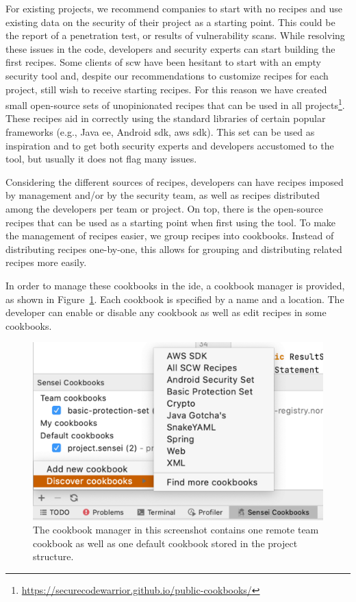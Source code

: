 For existing projects, we recommend companies to start with no recipes and use existing data on the security of their project as a starting point.
This could be the report of a penetration test, or results of vulnerability scans.
While resolving these issues in the code, developers and security experts can start building the first recipes.
Some clients of \gls{scw} have been hesitant to start with an empty security tool and, despite our recommendations to customize recipes for each project, still wish to receive starting recipes.
For this reason we have created small open-source sets of unopinionated recipes that can be used in all projects\footnote{\url{https://securecodewarrior.github.io/public-cookbooks/}}.
These recipes aid in correctly using the standard libraries of certain popular frameworks (e.g., Java 
\gls{ee}, Android \gls{sdk}, \gls{aws} \gls{sdk}).
This set can be used as inspiration and to get both security experts and developers accustomed to the tool, but usually it does not flag many issues.

Considering the different sources of recipes, developers can have recipes imposed by management and/or by the security team, as well as recipes distributed among the developers per team or project.
On top, there is the open-source recipes that can be used as a starting point when first using the tool.
To make the management of recipes easier, we group recipes into cookbooks.
Instead of distributing recipes one-by-one, this allows for grouping and distributing related recipes more easily. 

In order to manage these cookbooks in the \gls{ide}, a cookbook manager is provided, as shown in Figure~\ref{fig:cookbookmanager}.
Each cookbook is specified by a name and a location.
The developer can enable or disable any cookbook as well as edit recipes in some cookbooks.

\begin{figure}
  \centering
  \includegraphics[width=\textwidth,page=3]{04-tools/figures/figures1.pdf}
  \caption[Cookbook manager]{The cookbook manager in this screenshot contains one remote team cookbook as well as one default cookbook stored in the project structure.}
  \label{fig:cookbookmanager} 
\end{figure}

